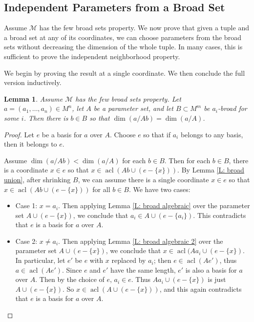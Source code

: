 \documentclass{amsart}
\newtheorem{lemma}[theorem]{Lemma}
\theoremstyle{definition}
\newcommand{\acl}{\operatorname{acl}}
\begin{document}
\subsection{Independent Parameters from a Broad Set}

Assume $\mathcal M$ has the few broad sets property. We now prove that given a tuple and a broad set at any of its coordinates, we can choose parameters from the broad sets without decreasing the dimension of the whole tuple. In many cases, this is sufficient to prove the independent neighborhood property.

We begin by proving the result at a single coordinate. We then conclude the full version inductively.

\begin{lemma}\label{L: ind broad}
    Assume $\mathcal M$ has the few broad sets property. Let $a=(a_1,\dots,a_n)\in M^n$, let $A$ be a parameter set, and let $B\subset M^m$ be $a_i$-broad for some $i$. Then there is $b\in B$ so that $\dim(a/Ab)=\dim(a/A)$.
\end{lemma}

\begin{proof}
    Let $e$ be a basis for $a$ over $A$. Choose $e$ so that if $a_i$ belongs to any basis, then it belongs to $e$.

    Assume $\dim(a/Ab)<\dim(a/A)$ for each $b\in B$. Then for each $b\in B$, there is a coordinate $x\in e$ so that $x\in\acl(Ab\cup(e-\{x\}))$. By Lemma \ref{L: broad union}, after shrinking $B$, we can assume there is a single coordinate $x\in e$ so that $x\in\acl(Ab\cup(e-\{x\}))$ for all $b\in B$. We have two cases:

    \begin{itemize}
        \item Case 1: $x=a_i$. Then applying Lemma \ref{L: broad algebraic} over the parameter set $A\cup(e-\{x\})$, we conclude that $a_i\in A\cup(e-\{a_i\})$. This contradicts that $e$ is a basis for $a$ over $A$.

        \item Case 2: $x\neq a_i$. Then applying Lemma \ref{L: broad algebraic 2} over the parameter set $A\cup(e-\{x\})$, we conclude that $x\in\acl(Aa_i\cup(e-\{x\})$. In particular, let $e'$ be $e$ with $x$ replaced by $a_i$; then $e\in\acl(Ae')$, thus $a\in\acl(Ae')$. Since $e$ and $e'$ have the same length, $e'$ is also a basis for $a$ over $A$. Then by the choice of $e$, $a_i\in e$. Thus $Aa_i\cup(e-\{x\})$ is just $A\cup(e-\{x\})$. So $x\in\acl(A\cup(e-\{x\}))$, and this again contradicts that $e$ is a basis for $a$ over $A$.
    \end{itemize}
\end{proof}
\end{document}
